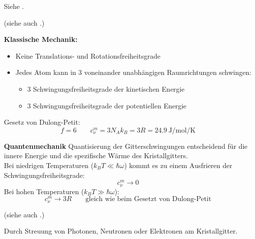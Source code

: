 \label{q:15}

Siehe .

\label{q:16}

(siehe auch .)

\textbf{Klassische Mechanik:}
\begin{itemize}
    \item Keine Translations- und Rotationsfreiheitsgrade
    \item Jedes Atom kann in 3 voneinander unabhängigen Raumrichtungen schwingen:
    \begin{itemize}
        \item 3 Schwingungsfreiheitsgrade der kinetischen Energie
        \item 3 Schwingungsfreiheitsgrade der potentiellen Energie
    \end{itemize}
\end{itemize}
Gesetz von Dulong-Petit:
\begin{equation}
    f = 6 \qquad c_\nu^m = 3N_Ak_B = 3R = \SI{24.9}{\joule\per\mole\per\kelvin}
\end{equation}

\textbf{Quantenmechanik}
Quantisierung der Gitterschwingungen entscheidend für die innere Energie und
die spezifische Wärme des Kristallgitters.\\
Bei niedrigen Temperaturen ($k_BT \ll \hbar\omega$) kommt es zu einem Ausfrieren der Schwingungsfreiheitsgrade:
\begin{equation}
    c_\nu^m \rightarrow 0
\end{equation}
Bei hohen Temperaturen ($k_BT \gg \hbar\omega$):
\begin{equation}
    c_\nu^m \rightarrow 3R \qquad \text{gleich wie beim Gesetzt von Dulong-Petit}
\end{equation}


\label{q:17}

(siehe auch .)

Durch Streuung von Photonen, Neutronen oder Elektronen am Kristallgitter. 

